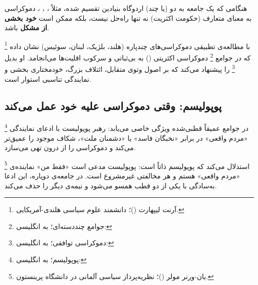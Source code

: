 \begin{tcolorbox}[enemybox,
	title={معضل جوامع عمیقاً دوپاره}]
	هنگامی که یک جامعه به دو (یا چند) اردوگاه بنیادین تقسیم شده،
	مثلاً ، ،
	، دموکراسی به معنای متعارف
	(حکومت اکثریت) نه تنها راه‌حل نیست، بلکه ممکن است \textbf{خود
		بخشی از مشکل} باشد.
\end{tcolorbox}


%
\footnote{%
	آرنت لیپهارت ()؛%
	دانشمند علوم سیاسی هلندی-آمریکایی.%
}%
با مطالعه‌ی تطبیقی دموکراسی‌های چندپاره (هلند، بلژیک، لبنان،
سوئیس) نشان داده که در جوامع
%
\footnote{جوامع چنددسته‌ای؛ به انگلیسی:
	}%
دموکراسی اکثریتی () به بی‌ثباتی و سرکوب
اقلیت‌ها می‌انجامد. او بدیل
%
\footnote{دموکراسی توافقی؛ به انگلیسی:
	}%
را پیشنهاد می‌کند که بر اصول وتوی متقابل، ائتلاف بزرگ،
خودمختاری بخشی و نمایندگی تناسبی استوار
است.

\subsection{پوپولیسم: وقتی دموکراسی علیه خود عمل می‌کند}
\label{subsec:ch02-t7-populism}

\begin{tcolorbox}[defbox,
	title={مفهوم: پوپولیسم در جوامع دوپاره}]
	\footnote{پوپولیسم؛ به انگلیسی: }%
	در جوامع عمیقاً قطبی‌شده ویژگی خاصی می‌یابد: رهبر پوپولیست
	با ادعای نمایندگی «مردم واقعی» در برابر «نخبگان فاسد» یا
	«دشمنان ملت»، شکاف موجود را عمیق‌تر می‌کند و دموکراسی را
	از درون تهی
	می‌سازد.
\end{tcolorbox}

%
\footnote{%
	یان-ورنر مولر ()؛%
	نظریه‌پرداز سیاسی آلمانی در دانشگاه پرینستون.%
}%
استدلال می‌کند که پوپولیسم ذاتاً  است:
پوپولیست مدعی است «فقط من» نماینده‌ی «مردم واقعی» هستم و هر
مخالفتی غیرمشروع
است.
در جامعه‌ی دوپاره، این ادعا به‌سادگی با یکی از دو قطب
همسو می‌شود و نیمه‌ی دیگر را حذف می‌کند.

